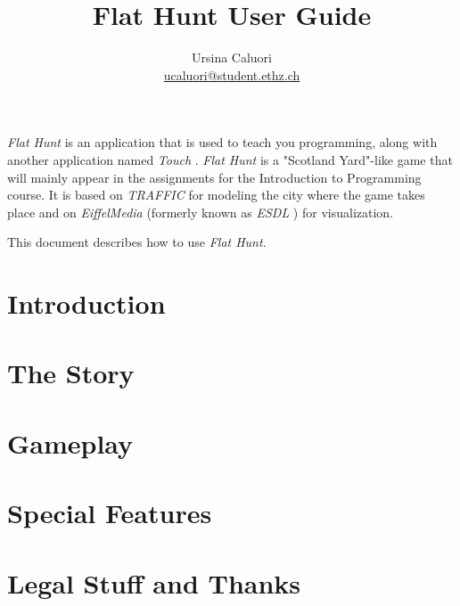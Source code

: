 \documentclass[a4paper,titlepage,12pt]{article}
\title{\textbf{Flat Hunt User Guide}}
\author{Ursina Caluori\\ \href{mailto: ucaluori@student.ethz.ch}{ucaluori@student.ethz.ch}}
\begin{document}
  \maketitle
  \tableofcontents
  \pagebreak

  \paragraph{}
  \emph{Flat Hunt} is an application that is used to teach you programming, along with another application named \emph{Touch} \cite{rk05}. \emph{Flat Hunt} is a "Scotland Yard"-like game that will mainly appear in the assignments for the Introduction to Programming course. It is based on \emph{TRAFFIC} \cite{sa05} for modeling the city where the game takes place and on \emph{EiffelMedia} (formerly known as \emph{ESDL} \cite{tgb03}) for visualization.\linebreak[2]

  This document describes how to use \emph{Flat Hunt}.
  
  \section{Introduction}
    
  \section{The Story}
    
  \section{Gameplay}
     
  \section{Special Features}
    
  \section{Legal Stuff and Thanks}
    
    
    
\end{document}
